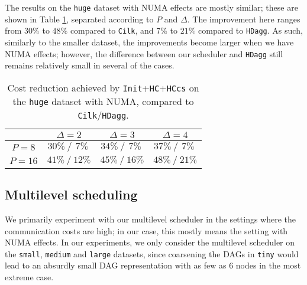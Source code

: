 \documentclass[sigconf,nonacm]{acmart}
\begin{document}
The results on the \texttt{huge} dataset with NUMA effects are mostly similar; these are shown in Table \ref{tab:huge_numa}, separated according to $P$ and $\Delta$. The improvement here ranges from $30\%$ to $48\%$ compared to \texttt{Cilk}, and $7\%$ to $21\%$ compared to \texttt{HDagg}. As such, similarly to the smaller dataset, the improvements become larger when we have NUMA effects; however, the difference between our scheduler and \texttt{HDagg} still remains relatively small in several of the cases.

\begin{table}[t]
\centering
\caption{Cost reduction achieved by \texttt{Init}+\texttt{HC}+\texttt{HCcs} on the \texttt{huge} dataset with NUMA, compared to \texttt{Cilk}/\texttt{HDagg}.}
\renewcommand{\arraystretch}{1.65}
\begin{tabular}{c || c | c | c|}
  & $\Delta=2$ & $\Delta=3$ & $\Delta=4$ \\ [0.5ex] 
 \hline\hline
 $P=8$ & $30\% \: / \: \,7\%\:$ & $34\% \: / \: \,7\%\:$ & $37\% \: / \: \,7\%\:$ \\
 \hline
 $P=16$ & $41\% \: / \: 12\%$ & $45\% \: / \: 16\%$ & $48\% \: / \: 21\%$ \\
 \hline
\end{tabular}
\label{tab:huge_numa}
\end{table}

\subsection{Multilevel scheduling}

We primarily experiment with our multilevel scheduler in the settings where the communication costs are high; in our case, this mostly means the setting with NUMA effects. In our experiments, we only consider the multilevel scheduler on the \texttt{small}, \texttt{medium} and \texttt{large} datasets, since coarsening the DAGs in \texttt{tiny} would lead to an absurdly small DAG representation with as few as $6$ nodes in the most extreme case.
\end{document}
